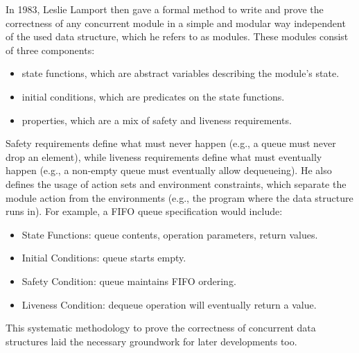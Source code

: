 In 1983, Leslie Lamport then gave a formal method to write and prove the correctness of any concurrent module in a simple and modular way independent of the used data structure, which he refers to as modules. These modules consist of three components: 
\begin{itemize}
   \item state functions, which are abstract variables describing the module's state.
   \item initial conditions, which are predicates on the state functions.
   \item properties, which are a mix of safety and liveness requirements.
\end{itemize}
Safety requirements define what must never happen (e.g., a queue must never drop an element), while liveness requirements define what must eventually happen (e.g., a non-empty queue must eventually allow dequeueing). He also defines the usage of action sets and environment constraints, which separate the module action from the environments (e.g., the program where the data structure runs in). For example, a \ac{FIFO} queue specification would include:
\begin{itemize}
   \item State Functions: queue contents, operation parameters, return values.
   \item Initial Conditions: queue starts empty.
   \item Safety Condition: queue maintains \ac{FIFO} ordering.
   \item Liveness Condition: dequeue operation will eventually return a value.
\end{itemize}
This systematic methodology to prove the correctness of concurrent data structures laid the necessary groundwork for later developments too. \cite{Lamport1983SPSCCircularBuffer}

